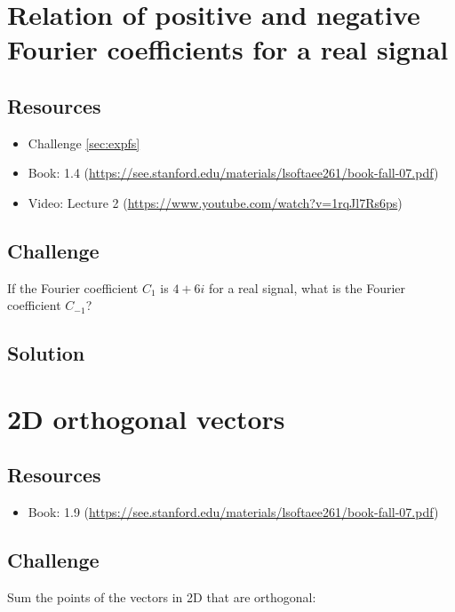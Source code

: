 \newpage

\section{Relation of positive and negative Fourier coefficients for a real signal}

\subsection*{Resources}
\begin{itemize}
    \item Challenge \ref{sec:expfs}
    \item Book: 1.4 (\url{https://see.stanford.edu/materials/lsoftaee261/book-fall-07.pdf})
    \item Video: Lecture 2 (\url{https://www.youtube.com/watch?v=1rqJl7Rs6ps})
\end{itemize}

\subsection*{Challenge}
If the Fourier coefficient $C_1$ is $4 + 6i$ for a real signal, what is the Fourier coefficient $C_{-1}$?

\subsection*{Solution}




\newpage
\section{2D orthogonal vectors}

\subsection*{Resources}
\begin{itemize}
    \item Book: 1.9 (\url{https://see.stanford.edu/materials/lsoftaee261/book-fall-07.pdf})
\end{itemize}

\subsection*{Challenge}
Sum the points of the vectors in 2D that are orthogonal:

